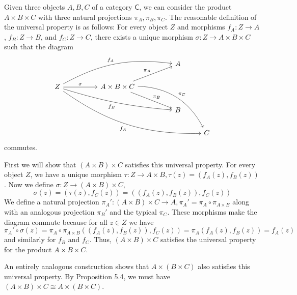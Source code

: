 \documentclass[../../master.tex]{subfiles}
\begin{document}
    \begin{solution}
      Given three objects \(A, B, C\) of a category \(\mathsf{C}\),
      we can consider the product \(A \times B \times C\) with three natural projections \(\pi_{A}, \pi_{B}, \pi_{C}\).
      The reasonable definition of the universal property is as follows:
      For every object \(Z\) and morphisms \(f_{A}: Z \to A\),  \(f_{B}: Z \to B\), and \(f_{C}: Z \to C\),
      there exists a unique morphism \(\sigma: Z \to A \times B \times C\) such that the diagram
      \[
      \begin{tikzcd}
        &&&& {A} \\
        {Z} && {A \times B \times C} \\
        &&&& {B} \\
        &&&&& {C}
        \arrow["{\sigma}", from=2-1, to=2-3]
        \arrow["{\pi_{A}}", from=2-3, to=1-5]
        \arrow["{\pi_{B}}", from=2-3, to=3-5]
        \arrow["{\pi_{C}}", from=2-3, to=4-6, bend left=30]
	      \arrow["{f_{A}}", from=2-1, to=1-5, bend left=18]
	      \arrow["{f_{B}}"', from=2-1, to=3-5, bend right=6]
	      \arrow["{f_{A}}"', from=2-1, to=4-6, bend right=18]
      \end{tikzcd}
      \]
      commutes.

      First we will show that \((A \times B) \times C\) satisfies this universal property.
      For every object \(Z\), we have a unique morphism \(\tau: Z \to A \times B, \tau(z) = (f_{A}(z), f_{B}(z))\).
      Now we define \(\sigma: Z \to (A \times B) \times C\),
      \begin{equation*}
        \sigma(z) = (\tau(z), f_{C}(z)) = ((f_{A}(z), f_{B}(z)), f_{C}(z))
      \end{equation*}
      We define a natural projection \(\pi_{A}':(A \times B) \times C \to A, \pi_{A}' = \pi_{A} \circ \pi_{A \times B}\)
      along with an analogous projection \(\pi_{B}'\) and the typical \(\pi_{C}\).
      These morphisms make the diagram commute because for all \(z \in Z\) we have
      \begin{equation*}
        \pi_{A}' \circ \sigma(z) = \pi_{A} \circ \pi_{A \times B} ((f_{A}(z), f_{B}(z)), f_{C}(z)) = \pi_{A} (f_{A}(z), f_{B}(z)) = f_{A}(z)
      \end{equation*}
      and similarly for \(f_{B}\) and \(f_{C}\).
      Thus, \((A \times B) \times C\) satisfies the universal property for the product \(A \times B \times C\).

      An entirely analogous construction shows that \(A \times (B \times C)\) also satisfies this universal property.
      By Proposition 5.4, we must have \((A \times B) \times C \cong A \times (B \times C)\).
    \end{solution}
\end{document}
